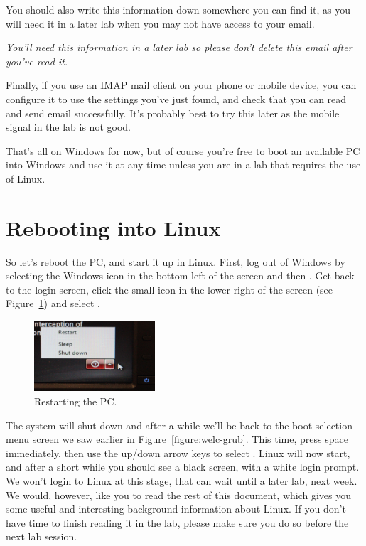 You should also write this information down somewhere you can find it, as you will need it in a later lab when you may not have access to your email.

\enlargethispage{\baselineskip}
\emph{You'll need this information in a later lab so please don't delete this email after you've read it.}


Finally, if you use an IMAP mail client on your phone or mobile
device, you can configure it to use the settings you've just found, and check
that you can read and send email successfully. It's probably best to try this later as the mobile signal in the lab is not good.

That's all on Windows for now, but of course  you're free to boot an available PC into Windows  and use it at any time unless you are in a lab that requires the use of Linux.

\section{Rebooting into Linux}
\label{sec:rebooting-into-linux}

So let's reboot the PC, and start it up in Linux. First, log out of
Windows by selecting the Windows icon in the bottom left of the screen and then . Get back to the login screen, click the
small icon in the lower right of the screen (see Figure~\ref{figure:welc-restart}) and select .

\begin{figure}
\centerline{\includegraphics[width=0.4\textwidth]{images/TH-shutdown-win}}
\caption{Restarting the PC.}
\label{figure:welc-restart}
\end{figure}

The system will shut down and after a while we'll be back to the boot selection menu
screen we saw earlier in Figure~\ref{figure:welc-grub}. This time, press space immediately, then use
the up/down arrow keys to select . Linux will now start, and after a short while you should
see a black screen, with a white login prompt. We won't login to Linux
at this stage, that can wait until a later lab, next week. We would,
however, like you to read the rest of this document, which gives you
some useful and interesting background information about Linux. If you
don't have time to finish reading it in the lab, please make sure you
do so before the next lab session.

